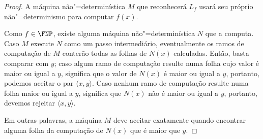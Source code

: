 \begin{proof}
    A máquina não"=determinística $M$ que reconhecerá $L_f$
    usará seu próprio não"=determinismo para computar $f(x)$.

    Como $f \in \FNP$,
    existe alguma máquina não"=determinística $N$ que a computa.
    Caso $M$ execute $N$ como um passo intermediário,
    eventualmente os ramos de computação de $M$
    conterão todas as folhas de $N(x)$ calculadas.
    Então, basta comparar com $y$;
    caso algum ramo de computação resulte numa folha
    cujo valor é maior ou igual a $y$,
    significa que o valor de $N(x)$ é maior ou igual a $y$,
    portanto, podemos aceitar o par $\langle x, y \rangle$.
    Caso nenhum ramo de computação resulte numa folha maior ou igual a $y$,
    significa que $N(x)$ não é maior ou igual a $y$,
    portanto, devemos rejeitar $\langle x, y \rangle$.

    Em outras palavras,
    a máquina $M$ deve aceitar exatamente quando encontrar
    alguma folha da computação de $N(x)$ que é maior que $y$.
\end{proof}

